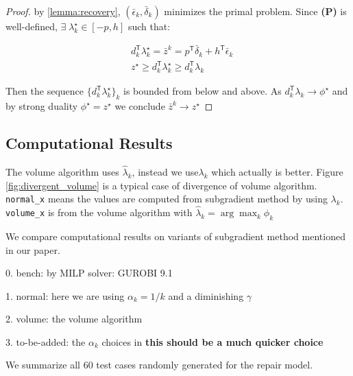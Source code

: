 \begin{proof}
  by \ref{lemma:recovery}, \((\bar \epsilon_k, \bar \delta_k)\) minimizes the primal
  problem. Since \textbf{(P)} is well-defined,
  \(\exists\; \lambda_k^\star \in [-p, h]\) such that:

  \[\begin{aligned}
       & d_k^\mathsf{T} \lambda_k^\star = \bar z^k = p^\mathsf{T} \bar \delta_k + h^\mathsf{T} \bar \epsilon_k \\
       & z^\star \ge d_k^\mathsf{T} \lambda_k^\star \ge  d_k^\mathsf{T} \lambda_k
    \end{aligned}\]

  Then the sequence \(\displaystyle\{d_k^\mathsf{T} \lambda_k^\star\}_k\)
  is bounded from below and above. As
  \(d_k^\mathsf{T} \lambda_k \to \phi^\star\) and by strong duality
  \(\phi^\star = z^\star\) we conclude \(\bar z^k \to z^\star\)
\end{proof}
\hypertarget{computational-results}{%
  \subsection{Computational Results}\label{computational-results}}



The volume algorithm uses \(\hat \lambda_{k}\), instead we use\(\lambda_{k}\) which actually is better.
Figure \ref{fig:divergent_volume} is a typical case of divergence of volume algorithm.
\texttt{normal\_x} means the values are computed from subgradient
method by using \(\lambda_{k}\). \texttt{volume\_x} is from the volume
algorithm with \(\hat \lambda_{k} = \arg\max_k \hat \phi_{k}\)

We compare computational results on variants of subgradient method mentioned in our paper.

0. bench: by MILP solver: GUROBI 9.1

1. normal: here we are using \(\alpha_k = 1/k\) and a diminishing \(\gamma\)

2. volume: the volume algorithm

3. to-be-added: the \(\alpha_k\) choices in \cite{brannlund1995generalized} \textbf{this should be a much quicker choice}

We summarize all \(60\) test cases randomly generated for the repair model.



